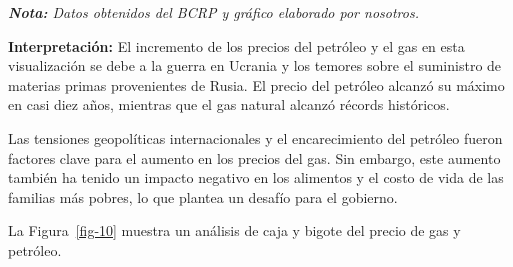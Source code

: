 \documentclass[
  letterpaper,
  DIV=11,
  numbers=noendperiod]{scrartcl}
\begin{document}
\emph{\textbf{Nota:} Datos obtenidos del BCRP y gráfico elaborado por
nosotros.}

\textbf{Interpretación:} El incremento de los precios del petróleo y el
gas en esta visualización se debe a la guerra en Ucrania y los temores
sobre el suministro de materias primas provenientes de Rusia. El precio
del petróleo alcanzó su máximo en casi diez años, mientras que el gas
natural alcanzó récords históricos.

Las tensiones geopolíticas internacionales y el encarecimiento del
petróleo fueron factores clave para el aumento en los precios del gas.
Sin embargo, este aumento también ha tenido un impacto negativo en los
alimentos y el costo de vida de las familias más pobres, lo que plantea
un desafío para el gobierno.

La Figura~\ref{fig-10} muestra un análisis de caja y bigote del precio
de gas y petróleo.
\end{document}
